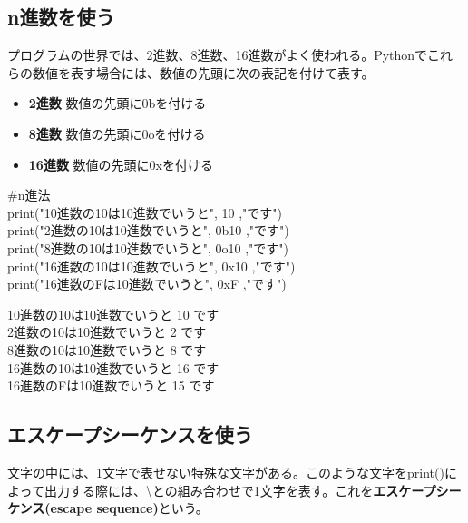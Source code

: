 \documentclass[11pt,a4paper]{jreport}
\begin{document}
\subsection{n進数を使う}
プログラムの世界では、2進数、8進数、16進数がよく使われる。Pythonでこれらの数値を表す場合には、数値の先頭に次の表記を付けて表す。

\begin{itemize}
 \item {\bf 2進数} 数値の先頭に0bを付ける
 \item {\bf 8進数} 数値の先頭に0oを付ける
 \item {\bf 16進数} 数値の先頭に0xを付ける
\end{itemize}

\begin{shadebox}
 \#n進法\\

 print("10進数の10は10進数でいうと", 10 ,"です")\\
 print("2進数の10は10進数でいうと", 0b10 ,"です")\\
 print("8進数の10は10進数でいうと", 0o10 ,"です")\\
 print("16進数の10は10進数でいうと", 0x10 ,"です")\\
 print("16進数のFは10進数でいうと", 0xF ,"です")

\end{shadebox}
\vspace{0.2in}
\begin{screen}
 10進数の10は10進数でいうと 10 です\\
 2進数の10は10進数でいうと 2 です\\
 8進数の10は10進数でいうと 8 です\\
 16進数の10は10進数でいうと 16 です\\
 16進数のFは10進数でいうと 15 です
\end{screen}
\vspace{0.2in}

\subsection{エスケープシーケンスを使う}
文字の中には、1文字で表せない特殊な文字がある。このような文字をprint()によって出力する際には、\textbackslash との組み合わせで1文字を表す。これを{\bf エスケープシーケンス(escape sequence)}という。
\end{document}
